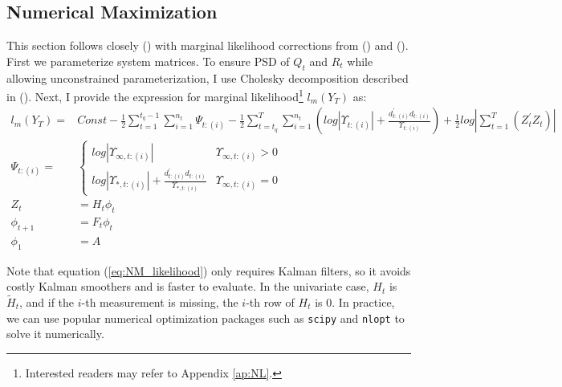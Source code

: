 \documentclass[10pt, titlepage]{article}
\numberwithin{equation}{section}
\begin{document}
\subsection{Numerical Maximization} \label{subsec:NM}
This section follows closely (\cite{durbin_koopman_2001}) with marginal likelihood corrections from (\cite{francke2010likelihood}) and (\cite{harville1974bayesian}). First we parameterize system matrices. To ensure PSD of $Q_t$ and $R_t$ while allowing unconstrained parameterization, I use Cholesky decomposition described in (\cite{pinheiro1996unconstrained}). Next, I provide the expression for marginal likelihood\footnote{Interested readers may refer to Appendix \ref{ap:NL}.} $l_m(Y_T)$ as:
\begin{align}
    l_m(Y_T) =& Const - \frac{1}{2}\sum_{t=1}^{t_q-1}\sum_{i=1}^{n_t}\Psi_{t:(i)} - \frac{1}{2}\sum_{t=t_q}^{T}\sum_{i=1}^{n_t}\left(log|\Upsilon_{t:(i)}| + \frac{d_{t:(i)}^{'}d_{t:(i)}}{\Upsilon_{t:(i)}}\right) + \frac{1}{2}log\left| \sum_{t=1}^{T}(Z_t^{'}Z_t) \right| \label{eq:NM_likelihood} \\
    \Psi_{t:(i)} =& \begin{cases}
        log|\Upsilon_{\infty,t:(i)}| & \Upsilon_{\infty,t:(i)} > 0 \\
        log|\Upsilon_{*,t:(i)}| + \frac{d_{t:(i)}^{'}d_{t:(i)}}{\Upsilon_{*,t:(i)}} & \Upsilon_{\infty,t:(i)}=0
    \end{cases} \nonumber \\
    Z_t &= H_t\phi_t \label{eq:marginal_correct} \\
    \phi_{t+1} &= F_t\phi_t \nonumber \\
    \phi_1 &= A \nonumber
\end{align}

Note that equation (\ref{eq:NM_likelihood}) only requires Kalman filters, so it avoids costly Kalman smoothers and is faster to evaluate. In the univariate case, $H_t$ is $\tilde{H}_t$, and if the $i$-th measurement is missing, the $i$-th row of $H_t$ is $0$.  In practice, we can use popular numerical optimization packages such as \texttt{scipy} and \texttt{nlopt} to solve it numerically.
\end{document}
